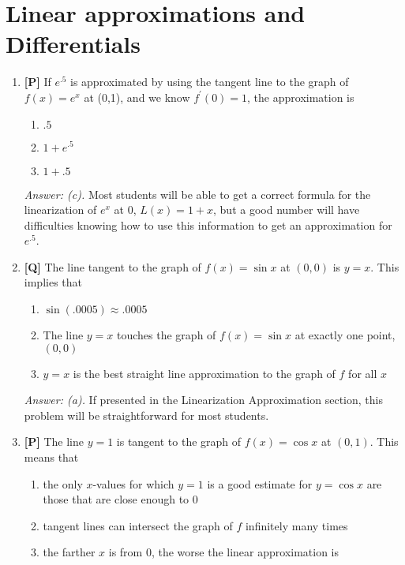 \documentclass[12pt]{article}
\begin{document}
\section{Linear approximations and Differentials}
\begin{enumerate}

\item {\bf [P]} If $e^{.5}$ is approximated by using the tangent line to the graph of 
$f(x)=e^x$ at (0,1), and we know $f^{\prime}(0)=1$, the approximation is
\begin{enumerate}
\item $.5$
\item $1+e^{.5}$
\item $1+.5$
\end{enumerate}

{\it Answer: (c).} Most students will be able to get a correct formula for the linearization of $e^x$ at $0$, $L(x)=1+x$, but a good number will have difficulties knowing how to use this information to get an approximation for $e^{.5}$.

\bigskip

\item {\bf [Q]} The line tangent to the graph of $f(x)=\sin x$ at $(0,0)$ is
$y=x$.  This implies that
\begin{enumerate}
\item $\sin(.0005)\approx .0005$
\item The line $y=x$ touches the graph of $f(x)=\sin x$ at exactly
one point, $(0,0)$
\item $y=x$ is the best straight line approximation to the graph of 
$f$ for all $x$
\end{enumerate}

{\it Answer: (a).} If presented in the Linearization Approximation section, this problem will be straightforward for most students.

\bigskip

\item {\bf [P]} The line $y=1$ is tangent to the graph of $f(x)=\cos x$ at $(0,1)$.  
This means that 
\begin{enumerate}
\item the only $x$-values for which $y=1$  is a good estimate for $y=\cos x$ 
are those that are close enough to $0$
\item tangent lines can intersect the graph of $f$ infinitely many times
\item the farther $x$ is from 0, the worse the linear approximation is
\end{enumerate}


\end{enumerate}
\end{document}

